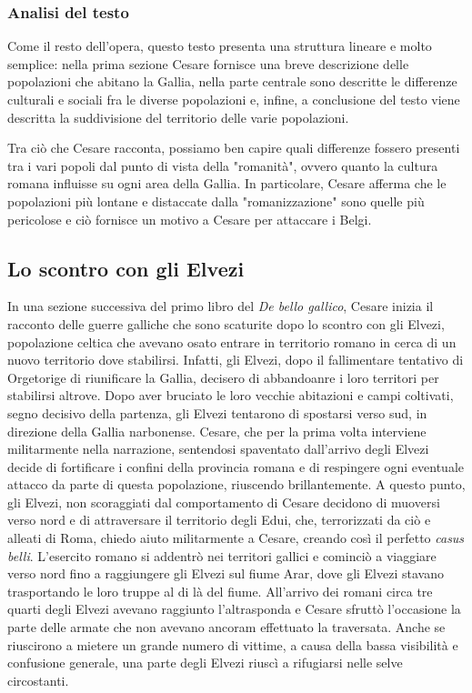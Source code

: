 \documentclass[10pt,a4paper]{article}
\begin{document}
	\subsubsection{Analisi del testo}

	Come il resto dell'opera, questo testo presenta una struttura lineare e molto semplice: nella prima sezione Cesare fornisce una breve descrizione delle popolazioni che abitano la Gallia, nella parte centrale sono descritte le differenze culturali e sociali fra le diverse popolazioni e, infine, a conclusione del testo viene descritta la suddivisione del territorio delle varie popolazioni.

	Tra ciò che Cesare racconta, possiamo ben capire quali differenze fossero presenti tra i vari popoli dal punto di vista della "romanità", ovvero quanto la cultura romana influisse su ogni area della Gallia. In particolare, Cesare afferma che le popolazioni più lontane e distaccate dalla "romanizzazione" sono quelle più pericolose e ciò fornisce un motivo a Cesare per attaccare i Belgi.

	\subsection{Lo scontro con gli Elvezi}

	In una sezione successiva del primo libro del \textit{De bello gallico}, Cesare inizia il racconto delle guerre galliche che sono scaturite dopo lo scontro con gli Elvezi, popolazione celtica che avevano osato entrare in territorio romano in cerca di un nuovo territorio dove stabilirsi. Infatti, gli Elvezi, dopo il fallimentare tentativo di Orgetorige di riunificare la Gallia, decisero di abbandoanre i loro territori per stabilirsi altrove. Dopo aver bruciato le loro vecchie abitazioni e campi coltivati, segno decisivo della partenza, gli Elvezi tentarono di spostarsi verso sud, in direzione della Gallia narbonense. Cesare, che per la prima volta interviene militarmente nella narrazione, sentendosi spaventato dall'arrivo degli Elvezi decide di fortificare i confini della provincia romana e di respingere ogni eventuale attacco da parte di questa popolazione, riuscendo brillantemente. A questo punto, gli Elvezi, non scoraggiati dal comportamento di Cesare decidono di muoversi verso nord e di attraversare il territorio degli Edui, che, terrorizzati da ciò e alleati di Roma, chiedo aiuto militarmente a Cesare, creando così il perfetto \textit{casus belli}. L'esercito romano si addentrò nei territori gallici e cominciò a viaggiare verso nord fino a raggiungere gli Elvezi sul fiume Arar, dove gli Elvezi stavano trasportando le loro truppe al di là del fiume. All'arrivo dei romani circa tre quarti degli Elvezi avevano raggiunto l'altrasponda e Cesare sfruttò l'occasione la parte delle armate che non avevano ancoram effettuato la traversata. Anche se riuscirono a mietere un grande numero di vittime, a causa della bassa visibilità e confusione generale, una parte degli Elvezi riuscì a rifugiarsi nelle selve circostanti.
\end{document}
